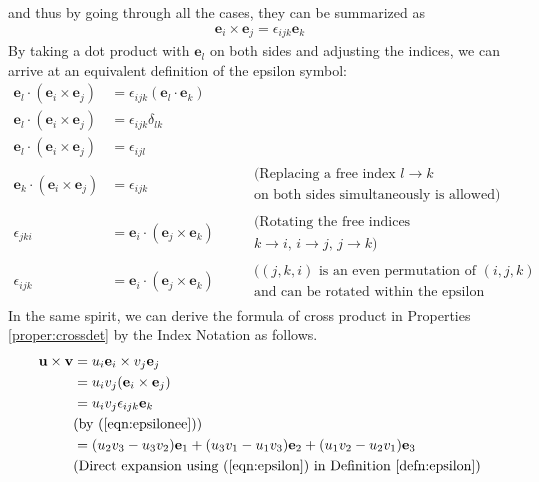and thus by going through all the cases, they can be summarized as
\begin{align}
\textbf{e}_i \times \textbf{e}_j= \epsilon_{ijk} \textbf{e}_k \label{eqn:epsilonee}
\end{align}
By taking a dot product with $\textbf{e}_l$ on both sides and adjusting the indices, we can arrive at an equivalent definition of the epsilon symbol:
\begin{align}
\textbf{e}_l \cdot (\textbf{e}_i \times \textbf{e}_j) &= \epsilon_{ijk} (\textbf{e}_l \cdot \textbf{e}_k)  \nonumber \\
\textbf{e}_l \cdot (\textbf{e}_i \times \textbf{e}_j) &= \epsilon_{ijk} \delta_{lk} \nonumber \\
\textbf{e}_l \cdot (\textbf{e}_i \times \textbf{e}_j) &= \epsilon_{ijl} \nonumber \\
\textbf{e}_k \cdot (\textbf{e}_i \times \textbf{e}_j) &= \epsilon_{ijk} \nonumber & &\begin{aligned}
&\text{(Replacing a free index $l \to k$} \\
&\text{on both sides simultaneously is allowed)}     
\end{aligned} \\
\epsilon_{jki} &= \textbf{e}_i \cdot (\textbf{e}_j \times \textbf{e}_k) & & \begin{aligned}
&\text{(Rotating the free indices} \\
&\text{$k \to i$, $i \to j$, $j \to k$)}    
\end{aligned}  \nonumber \\
\epsilon_{ijk} &= \textbf{e}_i \cdot (\textbf{e}_j \times \textbf{e}_k) 
& &\begin{aligned}
&\text{($(j,k,i)$ is an even permutation of $(i,j,k)$} \\
&\text{and can be rotated within the epsilon symbol)}    
\end{aligned} 
\end{align}
In the same spirit, we can derive the formula of cross product in Properties \ref{proper:crossdet} by the Index Notation as follows.
\begin{align}
\textbf{u} \times \textbf{v} &= u_i\textbf{e}_i \times v_j\textbf{e}_j \nonumber \\
&= u_iv_j (\textbf{e}_i \times \textbf{e}_j) \nonumber \\
&= u_iv_j \epsilon_{ijk} \textbf{e}_k \label{eqn:crossind} \\
& \text{(by (\ref{eqn:epsilonee}))} \nonumber \\
&= (u_2v_3 - u_3v_2)\textbf{e}_1 + (u_3v_1 - u_1v_3)\textbf{e}_2 + (u_1v_2 - u_2v_1)\textbf{e}_3 \nonumber \\
& \text{(Direct expansion using (\ref{eqn:epsilon}) in Definition \ref{defn:epsilon})} \nonumber
\end{align}
